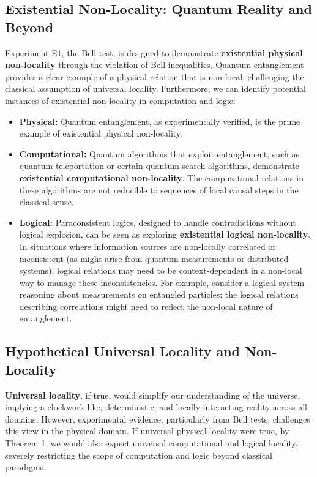\subsection{Existential Non-Locality: Quantum Reality and Beyond}

Experiment E1, the Bell test, is designed to demonstrate \textbf{existential physical non-locality} through the violation of Bell inequalities.  Quantum entanglement provides a clear example of a physical relation that is non-local, challenging the classical assumption of universal locality.  Furthermore, we can identify potential instances of existential non-locality in computation and logic:

\begin{itemize}
	\item \textbf{Physical:} Quantum entanglement, as experimentally verified, is the prime example of existential physical non-locality.
	\item \textbf{Computational:} Quantum algorithms that exploit entanglement, such as quantum teleportation or certain quantum search algorithms, demonstrate \textbf{existential computational non-locality}. The computational relations in these algorithms are not reducible to sequences of local causal steps in the classical sense.
	\item \textbf{Logical:} Paraconsistent logics, designed to handle contradictions without logical explosion, can be seen as exploring \textbf{existential logical non-locality}.  In situations where information sources are non-locally correlated or inconsistent (as might arise from quantum measurements or distributed systems), logical relations may need to be context-dependent in a non-local way to manage these inconsistencies. For example, consider a logical system reasoning about measurements on entangled particles; the logical relations describing correlations might need to reflect the non-local nature of entanglement.
\end{itemize}

\subsection{Hypothetical Universal Locality and Non-Locality}

\textbf{Universal locality}, if true, would simplify our understanding of the universe, implying a clockwork-like, deterministic, and locally interacting reality across all domains. However, experimental evidence, particularly from Bell tests, challenges this view in the physical domain.  If universal physical locality were true, by Theorem 1, we would also expect universal computational and logical locality, severely restricting the scope of computation and logic beyond classical paradigms.

